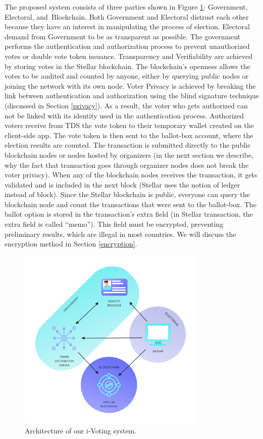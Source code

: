 \documentclass[applsci,article,accept,moreauthors,pdftex]{Definitions/mdpi}
\begin{document}
The proposed system consists of three parties shown in Figure \ref{fig:architecture}: Government, Electoral, and~Blockchain. Both Government and Electoral distrust each other because they have an interest in manipulating the process of election. 
Electoral demand from Government to be as transparent as possible. The government performs the authentication and authorization process to prevent unauthorized votes or {double vote token issuance}. Transparency and Verifiability are achieved by storing votes in the Stellar blockchain. The blockchain's openness allows the votes to be audited and counted by anyone, either by querying public nodes or joining the network with its own node. Voter Privacy is achieved by breaking the link between authentication and authorization using the blind signature technique (discussed in Section \ref{privacy}). As a result, the voter who gets authorized can not be linked with its identity used in the authentication process.
Authorized voters receive from TDS the vote token to their temporary wallet created on the client-side app. The vote token is then sent to the ballot-box account, where the election results are counted. The transaction is submitted directly to the public blockchain nodes or nodes hosted by organizers (in the next section we describe, why the fact that transaction goes through organizer nodes does not break the voter privacy). When any of the blockchain nodes receives the transaction, it gets validated and is included in the next block (Stellar uses the notion of ledger instead of block). %
Since the Stellar blockchain is public, everyone can query the blockchain node and count the transactions that were sent to the ballot-box. The ballot option is stored in the transaction's extra field (in Stellar transaction, the extra field is called ``memo''). This field must be encrypted, preventing preliminary results, which are illegal in most countries. We will discuss the encryption method in Section \ref{encryption}.

\begin{figure}[H]
\includegraphics[width=9cm]{figs/stellot-architecture.png}
\centering
\caption{Architecture of our i-Voting system.}
\label{fig:architecture}
\end{figure} 
\end{document}
